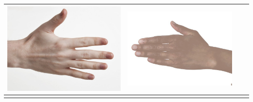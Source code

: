\begin{longtable}{|N||c|c|c|}
\begin{minipage}{.29\textwidth}
    \includegraphics[width=\textwidth,height=\textheight,keepaspectratio]{../inputs/hand_pale.jpg}
  \end{minipage} & 
  \begin{minipage}{.29\textwidth}
    \includegraphics[width=\textwidth,height=\textheight,keepaspectratio]{../rc_test/outputs/20170517_proportional_corrected_test_alpha10/hand_brown_to_hand_pale.jpg}
  \end{minipage} \\
\hline  \label{row:prop_correct_test_a10_hand_light_to_hand_dark} &
  \begin{minipage}{.29\textwidth}

\end{minipage}
\end{longtable}
